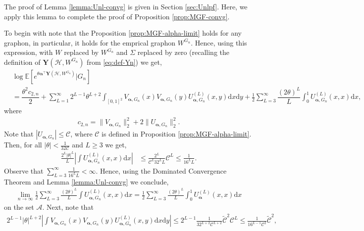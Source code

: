 \documentclass[11pt,reqno]{amsart}
\numberwithin{equation}{section}
\theoremstyle{definition}
\begin{document}
The proof of Lemma \ref{lemma:Unl-convg} is given in Section \ref{sec:Unlpf}. Here, we apply this lemma to complete the proof of Proposition \ref{prop:MGF-convg}. 

To begin with note that the Proposition \ref{prop:MGF-alpha-limit}  holds for any graphon, in particular, it holds for the emprical graphon $W^{G_{n}}$. Hence, using this expression, with $W$ replaced by $W^{G_{n}}$ and $\Sigma$ replaced by zero (recalling the definition of $\bm{Y}(\mathcal{H},W^{G_{n}})$ from \eqref{eq:def-Yn}) we get,
\begin{align*}
    & \log\mathbb{E}\left[ e^{\theta \bm{\alpha}^{\top}\bm{Y}(\bm{\mathcal{H}},W^{G_n})} | G_n \right] \nonumber \\ 
    &= \dfrac{\theta^{2} c_{2, n}}{2}  + \sum_{L = 1}^{\infty} 2^{L-1}\theta^{L+2} \int_{[0, 1]^2} V_{\bm \alpha, G_n}(x)V_{\bm \alpha, G_n}(y)U_{\bm \alpha, G_n}^{(L)}(x,y)\mathrm{d}x\mathrm{d}y + \frac{1}{2}\sum_{L=3}^{\infty}\dfrac{\left(2 \theta\right)^{L}}{L} \int_{0}^{1} U_{\bm \alpha, G_n}^{(L)}(x, x)\mathrm{d}x , 
\end{align*}  
where 
\begin{align}\label{eq:cn}
c_{2, n} = \| V_{\bm \alpha, G_n} \|_2^2 + 2 \| U_{\bm \alpha, G_n} \|_2^2.
\end{align} 
Note that $|U_{\bm \alpha, G_n}|\leq \mathcal{C}$, where $\mathcal{C}$ is defined in Proposition \ref{prop:MGF-alpha-limit}. Then, for all $|\theta|<\frac{1}{32\mathcal{C}}$ and $L \geq 3$ we get,
\begin{align*}
    \frac{2^{L}|\theta|^{L}}{L}\left|\int U_{\bm \alpha, G_n}^{(L)}(x,x)\mathrm{d}x\right|
    &\leq \frac{2^{L}}{\mathcal{C}^{L}32^{L}L}\mathcal{C}^{L}\leq \frac{1}{16^{L}L}.
\end{align*}
Observe that $\sum_{L=3}^{\infty}\frac{1}{16^{L}L}<\infty$. Hence, using the Dominated Convergence Theorem and Lemma \ref{lemma:Unl-convg} we conclude,
\begin{align}\label{eq:rest-term-convg-1}
    \lim_{n \rightarrow \infty} \frac{1}{2}\sum_{L=3}^{\infty}\frac{(2 \theta)^{L}}{L}\int U_{\bm{\alpha}, G_n}^{(L)}(x,x)\mathrm{d}x = \frac{1}{2}\sum_{L=3}^{\infty}\frac{(2 \theta)^{L}}{L}\int_{0}^{1} U_{\bm \alpha}^{(L)}(x,x)\mathrm{d}x 
\end{align} 
on the set $\mathcal{A}$. 
Next, note that 
\begin{align*}
    2^{L-1}|\theta|^{L+2}\left|\int V_{\bm \alpha, G_n}(x)V_{\bm \alpha, G_n}(y)U_{\bm \alpha, G_n}^{(L)}(x,y)\mathrm{d}x\mathrm{d}y\right| \leq 2^{L-1}\frac{1}{32^{L+2}\mathcal{C}^{L+2}}\tilde{\mathcal{C}}^{2}\mathcal{C}^{L}\leq \frac{1}{16^{L-1}\mathcal{C}^{2}} \tilde{\mathcal{C}}^{2} , 
\end{align*} 
\end{document}
